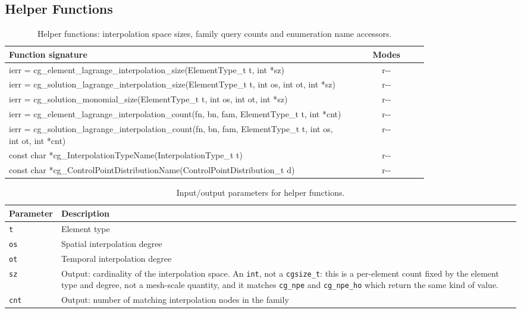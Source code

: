 \documentclass[11pt,letterpaper]{article}
\newif\ifvfourdraft
\newcommand{\vfour}[1]{\ifvfourdraft\textcolor{v4violet}{#1}\else#1\fi}
\begin{document}
\subsection{Helper Functions}

\begin{table}[htbp]
\centering
\small
{}
\begin{tabular}{@{} >{\raggedright\ttfamily\small}p{0.82\linewidth} c @{}}
\toprule
\textbf{Function signature} & \textbf{Modes} \\
\midrule
ierr = cg\_element\_lagrange\_interpolation\_size(ElementType\_t t, \vfour{int} *sz) & r{-}{-} \\
ierr = cg\_solution\_lagrange\_interpolation\_size(ElementType\_t t, int os, int ot, \vfour{int} *sz) & r{-}{-} \\
ierr = cg\_solution\_monomial\_size(ElementType\_t t, int os, int ot, \vfour{int} *sz) & r{-}{-} \\
\addlinespace
ierr = cg\_element\_lagrange\_interpolation\_count(fn, bn, fam, ElementType\_t t, int *cnt) & r{-}{-} \\
ierr = cg\_solution\_lagrange\_interpolation\_count(fn, bn, fam, ElementType\_t t, int os, int ot, int *cnt) & r{-}{-} \\
\addlinespace
\vfour{const char *cg\_InterpolationTypeName(InterpolationType\_t t)} & \vfour{r{-}{-}} \\
\vfour{const char *cg\_ControlPointDistributionName(ControlPointDistribution\_t d)} & \vfour{r{-}{-}} \\
\bottomrule
\end{tabular}
\caption{Helper functions: interpolation space sizes, family query counts
\vfour{and enumeration name accessors}.}
\label{tab:helper-funcs}
\end{table}

\begin{table}[htbp]
\centering
\small
{}
\begin{tabular}{@{} l p{} @{}}
\toprule
\textbf{Parameter} & \textbf{Description} \\
\midrule
\texttt{t}   & Element type \\
\texttt{os}  & Spatial interpolation degree \\
\texttt{ot}  & Temporal interpolation degree \\
\texttt{sz}  & Output: cardinality of the interpolation space.
  \vfour{An \texttt{int}, not a \texttt{cgsize\_t}: this is a per-element count
  fixed by the element type and degree, not a mesh-scale quantity, and it
  matches \texttt{cg\_npe} and \texttt{cg\_npe\_ho} which return the same kind of
  value.} \\
\texttt{cnt} & Output: number of matching interpolation nodes in the family \\
\bottomrule
\end{tabular}
\caption{Input/output parameters for helper functions.}
\end{table}
\end{document}
